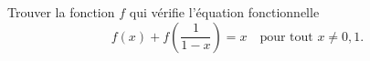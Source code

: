Trouver la fonction $f$ qui vérifie l'équation fonctionnelle
\[ f(x) + f\left(\frac{1}{1 - x}\right) = x \quad\text{pour tout } x \neq 0, 1. \]
